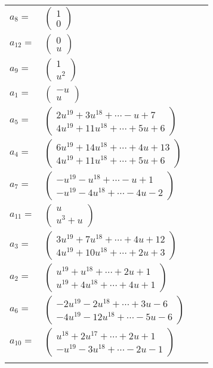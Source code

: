 \documentclass[1p]{elsarticle_modified}
\theoremstyle{definition}
\begin{document}
\begin{tabular}{m{7pt} m{180pt} m{7pt} m{180pt} }
\flushright $a_{8}=$&$\begin{pmatrix}1\\0\end{pmatrix}$ \\
\flushright $a_{12}=$&$\begin{pmatrix}0\\u\end{pmatrix}$ \\
\flushright $a_{9}=$&$\begin{pmatrix}1\\u^2\end{pmatrix}$ \\
\flushright $a_{1}=$&$\begin{pmatrix}- u\\u\end{pmatrix}$ \\
\flushright $a_{5}=$&$\begin{pmatrix}2 u^{19}+3 u^{18}+\cdots- u+7\\4 u^{19}+11 u^{18}+\cdots+5 u+6\end{pmatrix}$ \\
\flushright $a_{4}=$&$\begin{pmatrix}6 u^{19}+14 u^{18}+\cdots+4 u+13\\4 u^{19}+11 u^{18}+\cdots+5 u+6\end{pmatrix}$ \\
\flushright $a_{7}=$&$\begin{pmatrix}- u^{19}- u^{18}+\cdots- u+1\\- u^{19}-4 u^{18}+\cdots-4 u-2\end{pmatrix}$ \\
\flushright $a_{11}=$&$\begin{pmatrix}u\\u^3+u\end{pmatrix}$ \\
\flushright $a_{3}=$&$\begin{pmatrix}3 u^{19}+7 u^{18}+\cdots+4 u+12\\4 u^{19}+10 u^{18}+\cdots+2 u+3\end{pmatrix}$ \\
\flushright $a_{2}=$&$\begin{pmatrix}u^{19}+u^{18}+\cdots+2 u+1\\u^{19}+4 u^{18}+\cdots+4 u+1\end{pmatrix}$ \\
\flushright $a_{6}=$&$\begin{pmatrix}-2 u^{19}-2 u^{18}+\cdots+3 u-6\\-4 u^{19}-12 u^{18}+\cdots-5 u-6\end{pmatrix}$ \\
\flushright $a_{10}=$&$\begin{pmatrix}u^{18}+2 u^{17}+\cdots+2 u+1\\- u^{19}-3 u^{18}+\cdots-2 u-1\end{pmatrix}$\\&\end{tabular}
\end{document}
